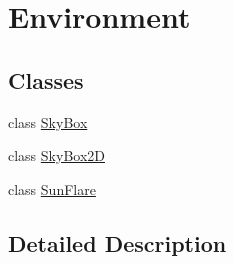 \hypertarget{group__gr___environment}{}\section{Environment}
\label{group__gr___environment}
\subsection*{Classes}
\begin{DoxyCompactItemize}
\item 
class \hyperlink{class_sky_box}{Sky\+Box}
\item 
class \hyperlink{class_sky_box2_d}{Sky\+Box2D}
\item 
class \hyperlink{class_sun_flare}{Sun\+Flare}
\end{DoxyCompactItemize}


\subsection{Detailed Description}
